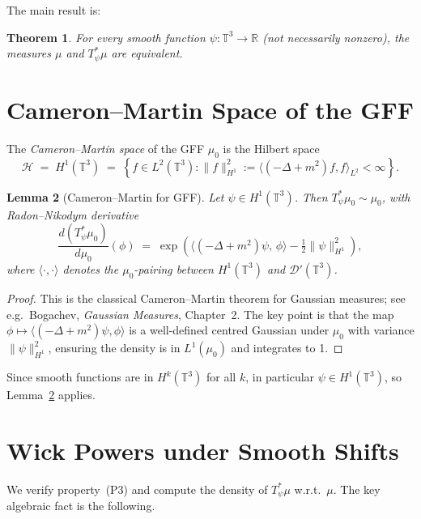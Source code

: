 \documentclass[12pt]{article}
\newtheorem{theorem}{Theorem}
\newtheorem{lemma}[theorem]{Lemma}
\theoremstyle{definition}
\theoremstyle{remark}
\begin{document}
\noindent The main result is:

\begin{theorem}\label{thm:main}
For every smooth function $\psi:\mathbb{T}^3\to\mathbb{R}$ (not necessarily
nonzero), the measures $\mu$ and $T_\psi^*\mu$ are equivalent.
\end{theorem}

\section{Cameron--Martin Space of the GFF}

The \emph{Cameron--Martin space} of the GFF $\mu_0$ is the Hilbert space
\[
  \mathcal{H} \;=\; H^1(\mathbb{T}^3)
  \;=\; \left\{f\in L^2(\mathbb{T}^3) :
    \|f\|_{H^1}^2 := \langle(-\Delta+m^2)f,f\rangle_{L^2} < \infty\right\}.
\]

\begin{lemma}[Cameron--Martin for GFF]\label{lem:CM}
Let $\psi\in H^1(\mathbb{T}^3)$.  Then $T_\psi^*\mu_0\sim\mu_0$, with
Radon--Nikodym derivative
\[
  \frac{d(T_\psi^*\mu_0)}{d\mu_0}(\phi)
  \;=\; \exp\!\left(\langle(-\Delta+m^2)\psi,\,\phi\rangle
        - \tfrac12\|{\psi}\|_{H^1}^2\right),
\]
where $\langle\cdot,\cdot\rangle$ denotes the $\mu_0$-pairing between
$H^1(\mathbb{T}^3)$ and $\mathcal{D}'(\mathbb{T}^3)$.
\end{lemma}

\begin{proof}
This is the classical Cameron--Martin theorem for Gaussian measures; see e.g.\
Bogachev, \emph{Gaussian Measures}, Chapter~2.  The key point is that
the map $\phi\mapsto\langle(-\Delta+m^2)\psi,\phi\rangle$ is a well-defined
centred Gaussian under $\mu_0$ with variance $\|\psi\|_{H^1}^2$, ensuring
the density is in $L^1(\mu_0)$ and integrates to 1.
\end{proof}

\noindent Since smooth functions are in $H^k(\mathbb{T}^3)$ for all $k$, in
particular $\psi\in H^1(\mathbb{T}^3)$, so Lemma~\ref{lem:CM} applies.

\section{Wick Powers under Smooth Shifts}

We verify property~(P3) and compute the density of $T_\psi^*\mu$ w.r.t.\ $\mu$.
The key algebraic fact is the following.
\end{document}
